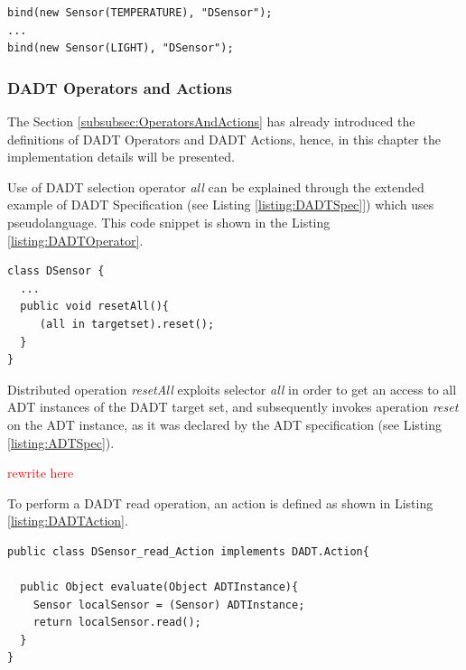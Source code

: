  
\begin{lstlisting}[frame=trbl, basewidth={0.55em, 0.6em}, captionpos=b, 
basicstyle=\ttfamily\footnotesize, breaklines, caption = Binding ADT instances to a DADT instance, label = listing:binding]
bind(new Sensor(TEMPERATURE), "DSensor");
...
bind(new Sensor(LIGHT), "DSensor");
\end{lstlisting} 


\subsubsection{DADT Operators and Actions}
\label{subsubsec:OperatorsAndActionsImpl}

The Section \ref{subsubsec:OperatorsAndActions} has already introduced the
definitions of DADT Operators and DADT Actions, hence, in this chapter the
implementation details will be presented. 

Use of DADT selection operator \emph{all} can be explained through the
extended example of DADT Specification (see Listing \ref{listing:DADTSpec]})
which uses pseudolanguage. This code snippet is shown in the
Listing \ref{listing:DADTOperator}.

\begin{lstlisting}[frame=trbl, basewidth={0.55em, 0.6em}, captionpos=b, 
basicstyle=\ttfamily\footnotesize, breaklines, caption = Defining a DADT action, label = listing:DADTOperator]  
class DSensor {
  ...
  public void resetAll(){
	 (all in targetset).reset();
  }
}
\end{lstlisting}

Distributed operation \emph{resetAll} exploits selector \emph{all} in order to
get an access to all ADT instances of the DADT target set, and
subsequently invokes aperation \emph{reset} on the ADT instance, as it was
declared by the ADT specification (see Listing \ref{listing:ADTSpec}).

\textcolor{red}{rewrite here }

To perform a DADT read operation, an action is defined
as shown in Listing
\ref{listing:DADTAction}. 
 
\begin{lstlisting}[frame=trbl, basewidth={0.55em, 0.6em}, captionpos=b, 
basicstyle=\ttfamily\footnotesize, breaklines, caption = Defining a DADT action, label = listing:DADTAction ]  
public class DSensor_read_Action implements DADT.Action{

  public Object evaluate(Object ADTInstance){
	Sensor localSensor = (Sensor) ADTInstance;
    return localSensor.read();
  }
}
\end{lstlisting}


